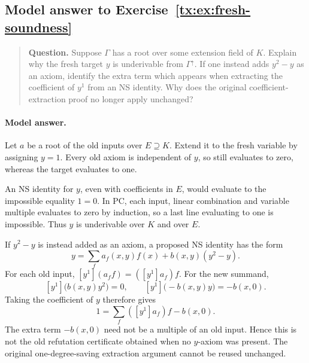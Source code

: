 \documentclass[11pt,a4paper,oneside,openany]{book}
\theoremstyle{definition}\newtheorem{definition}[theorem]{Definition}
\theoremstyle{remark}\newtheorem{remark}[theorem]{Remark}
\numberwithin{equation}{chapter}
\begin{document}
\par


\begin{samepage}

\subsection*{Model answer to Exercise~\ref{tx:ex:fresh-soundness}}\label{tx:ans:fresh-soundness}

\begin{quote}\small\textbf{Question.} Suppose $\Gamma$ has a root over some extension field of $K$. Explain
why the fresh target $y$ is underivable from $\Gamma^\uparrow$.
If one instead adds $y^2-y$ as an axiom, identify the extra term which
appears when extracting the coefficient of $y^1$ from an NS identity.
Why does the original coefficient-extraction proof no longer apply
unchanged?
\end{quote}

\paragraph{Model answer.}
Let \(a\) be a root of the old inputs over \(E\supseteq K\).
Extend it to the fresh variable by assigning \(y=1\).
Every old axiom is independent of \(y\), so still evaluates to zero,
whereas the target evaluates to one.
\end{samepage}

An NS identity for \(y\), even with coefficients in \(E\), would
evaluate to the impossible equality \(1=0\). In PC, each input,
linear combination and variable multiple evaluates to zero by
induction, so a last line evaluating to one is impossible.
Thus \(y\) is underivable over \(K\) and over \(E\).

If \(y^2-y\) is instead added as an axiom, a proposed NS identity has
the form
\[
                 y=\sum_f a_f(x,y)f(x)+b(x,y)(y^2-y).
\]
For each old input,
\([y^1](a_f f)=([y^1]a_f)f\). For the new summand,
\[
 [y^1]\bigl(b(x,y)y^2\bigr)=0,\qquad
 [y^1]\bigl(-b(x,y)y\bigr)=-b(x,0).
\]
Taking the coefficient of \(y\) therefore gives
\[
                       1=\sum_f([y^1]a_f)f-b(x,0).
\]
The extra term \(-b(x,0)\) need not be a multiple of an old input.
Hence this is not the old refutation certificate obtained when no
\(y\)-axiom was present. The original one-degree-saving extraction
argument cannot be reused unchanged.
\end{document}

